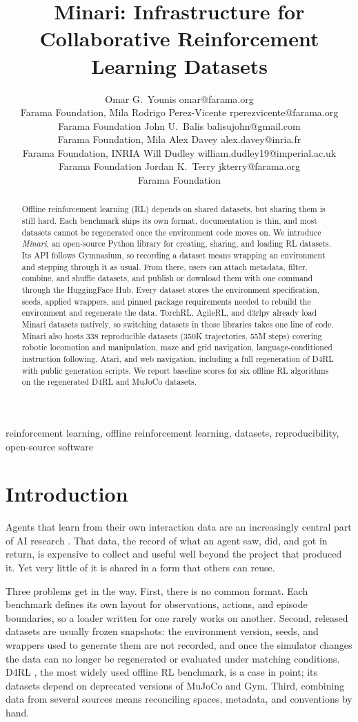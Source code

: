 \documentclass{article}
\title{Minari: Infrastructure for Collaborative Reinforcement Learning Datasets}
\author{\name Omar G.~Younis \email omar@farama.org \\
       \addr Farama Foundation, Mila
       \AND
       \name Rodrigo Perez-Vicente \email rperezvicente@farama.org \\
       \addr Farama Foundation
       \AND
       \name John U.~Balis \email balisujohn@gmail.com \\
       \addr Farama Foundation, Mila
       \AND
       \name Alex Davey \email alex.davey@inria.fr \\
       \addr Farama Foundation, INRIA
       \AND
       \name Will Dudley \email william.dudley19@imperial.ac.uk \\
       \addr Farama Foundation
       \AND
       \name Jordan K.~Terry \email jkterry@farama.org \\
       \addr Farama Foundation}
\newcommand{\numdatasets}{338\xspace}
\newcommand{\numtrajectories}{350K\xspace}
\newcommand{\numsteps}{55M\xspace}
\begin{document}
\maketitle

\begin{abstract}
Offline reinforcement learning (RL) depends on shared datasets, but sharing them is still hard. Each benchmark ships its own format, documentation is thin, and most datasets cannot be regenerated once the environment code moves on. We introduce \emph{Minari}, an open-source Python library for creating, sharing, and loading RL datasets. Its API follows Gymnasium, so recording a dataset means wrapping an environment and stepping through it as usual. From there, users can attach metadata, filter, combine, and shuffle datasets, and publish or download them with one command through the HuggingFace Hub. Every dataset stores the environment specification, seeds, applied wrappers, and pinned package requirements needed to rebuild the environment and regenerate the data.
TorchRL, AgileRL, and d3rlpy already load Minari datasets natively, so switching datasets in those libraries takes one line of code. Minari also hosts \numdatasets reproducible datasets (\numtrajectories trajectories, \numsteps steps) covering robotic locomotion and manipulation, maze and grid navigation, language-conditioned instruction following, Atari, and web navigation, including a full regeneration of D4RL with public generation scripts. We report baseline scores for six offline RL algorithms on the regenerated D4RL and MuJoCo datasets.
\end{abstract}

\begin{keywords}
  reinforcement learning, offline reinforcement learning, datasets, reproducibility, open-source software
\end{keywords}

\section{Introduction}

Agents that learn from their own interaction data are an increasingly central part of AI research \citep{experience-era}. That data, the record of what an agent saw, did, and got in return, is expensive to collect and useful well beyond the project that produced it. Yet very little of it is shared in a form that others can reuse.

Three problems get in the way. First, there is no common format. Each benchmark defines its own layout for observations, actions, and episode boundaries, so a loader written for one rarely works on another. Second, released datasets are usually frozen snapshots: the environment version, seeds, and wrappers used to generate them are not recorded, and once the simulator changes the data can no longer be regenerated or evaluated under matching conditions. D4RL \citep{d4rl}, the most widely used offline RL benchmark, is a case in point; its datasets depend on deprecated versions of MuJoCo and Gym. Third, combining data from several sources means reconciling spaces, metadata, and conventions by hand.
\end{document}

